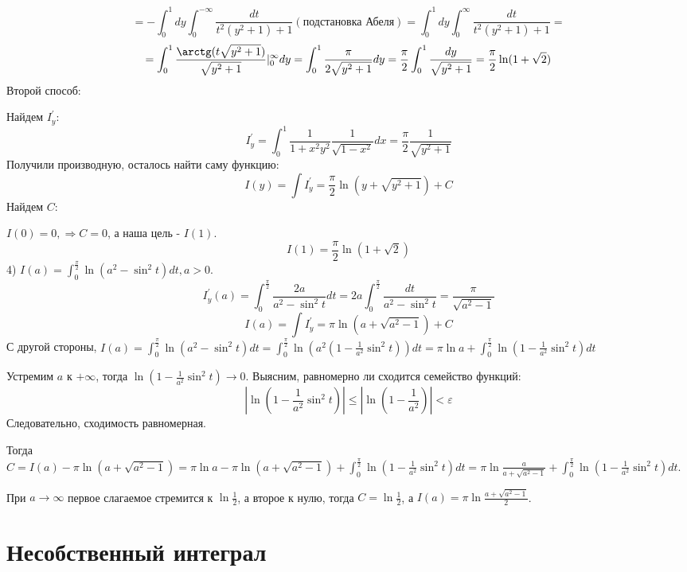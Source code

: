 \documentclass[12pt]{article}
\begin{document}
$$= -\int_0^1 dy \int_0^{- \infty} \frac{dt}{t^2(y^2+1)+1} (\text{подстановка Абеля}) = \int_0^1 dy \int_0^\infty \frac{dt}{t^2(y^2+1)+1} = $$
$$= \int_0^1 \frac{\arctg (t \sqrt{y^2+1})}{\sqrt{y^2+1}} |_0^{\infty} dy = \int_0^1 \frac{\pi}{2\sqrt{y^2+1}} dy = \frac{\pi}{2} \int_0^1 \frac{dy}{\sqrt{y^2+1}} = \frac{\pi}{2} \ln(1+\sqrt{2})$$
Второй способ:\par
Найдем $I^{'}_y$:
$$I^{'}_y = \int_0^1 \frac{1}{1+x^2y^2} \frac{1}{\sqrt{1-x^2}} dx = \frac{\pi}{2} \frac{1}{\sqrt{y^2+1}}$$
Получили производную, осталось найти саму функцию:
$$I(y) = \int I^{'}_y = \frac{\pi}{2} \ln (y + \sqrt{y^2+1}) + C$$
Найдем $C$:\par
$I(0) = 0, \Rightarrow C = 0$, а наша цель - $I(1)$.
$$I(1) = \frac{\pi}{2} \ln(1+\sqrt{2})$$
4) $I(a) = \int_0^{\frac{\pi}{2}} \ln (a^2 - \sin^2 t)dt, a>0$.
$$I^{'}_y(a) = \int_0^{\frac{\pi}{2}} \frac{2a}{a^2-\sin^2t}dt = 2a \int_0^{\frac{\pi}{2}} \frac{dt}{a^2-\sin^2t} = \frac{\pi}{\sqrt{a^2-1}}$$
$$I(a) = \int I^{'}_y = \pi \ln (a+\sqrt{a^2-1}) + C$$
С другой стороны, $I(a) = \int_0^{\frac{\pi}{2}} \ln (a^2 - \sin^2 t)dt = \int_0^{\frac{\pi}{2}} \ln (a^2 (1 - \frac{1}{a^2} \sin^2 t)) dt = \pi \ln a + \int_0^{\frac{\pi}{2}} \ln (1 - \frac{1}{a^2} \sin^2 t) dt$\par
Устремим $a$ к $+\infty$, тогда $\ln (1 - \frac{1}{a^2} \sin^2 t) \to 0$. Выясним, равномерно ли сходится семейство функций:
$$|\ln (1 - \frac{1}{a^2} \sin^2t)| \leq |\ln (1 - \frac{1}{a^2})| < \varepsilon$$
Следовательно, сходимость равномерная.\par
Тогда $C = I(a) - \pi \ln (a+\sqrt{a^2-1}) = \pi \ln a - \pi \ln (a + \sqrt{a^2-1}) + \int_0^{\frac{\pi}{2}} \ln (1 - \frac{1}{a^2} \sin^2 t) dt = \pi \ln \frac{a}{a+\sqrt{a^2-1}} + \int_0^{\frac{\pi}{2}} \ln (1 - \frac{1}{a^2} \sin^2 t) dt$.\par
При $a \to \infty$ первое слагаемое стремится к $\ln \frac{1}{2}$, а второе к нулю, тогда $C = \ln \frac{1}{2}$, а $I(a) = \pi \ln \frac{a+\sqrt{a^2-1}}{2}$.\par
\section{Несобственный интеграл}
\end{document}
